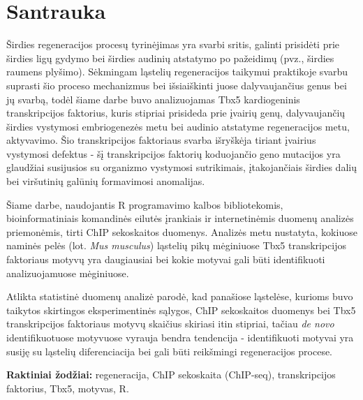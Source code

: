 \documentclass[12pt]{article}
\begin{document}

\section*{Santrauka}
Širdies regeneracijos procesų tyrinėjimas yra svarbi sritis, galinti prisidėti
prie širdies ligų gydymo bei širdies audinių atstatymo po pažeidimų (pvz.,
širdies raumens plyšimo). Sėkmingam ląstelių regeneracijos taikymui praktikoje
svarbu suprasti šio proceso mechanizmus bei išsiaiškinti juose dalyvaujančius
genus bei jų svarbą, todėl šiame darbe buvo analizuojamas Tbx5 kardiogeninis
transkripcijos faktorius, kuris stipriai prisideda prie įvairių genų,
dalyvaujančių širdies vystymosi embriogenezės metu bei audinio atstatyme
regeneracijos metu, aktyvavimo. Šio transkripcijos faktoriaus svarba išryškėja
tiriant įvairius vystymosi defektus - šį transkripcijos faktorių koduojančio
geno mutacijos yra glaudžiai susijusios su organizmo vystymosi sutrikimais,
įtakojančiais širdies dalių bei viršutinių galūnių formavimosi anomalijas.
                                                                                     
Šiame darbe, naudojantis R programavimo kalbos bibliotekomis, bioinformatiniais
komandinės eilutės įrankiais ir internetinėmis duomenų analizės priemonėmis,
tirti ChIP sekoskaitos duomenys. Analizės metu nustatyta, kokiuose naminės
pelės (lot. \emph{Mus musculus}) ląstelių pikų mėginiuose Tbx5 transkripcijos
faktoriaus motyvų yra daugiausiai bei kokie motyvai gali būti identifikuoti
analizuojamuose mėginiuose.

Atlikta statistinė duomenų analizė parodė, kad panašiose ląstelėse, kurioms
buvo taikytos skirtingos eksperimentinės sąlygos, ChIP sekoskaitos duomenys
bei Tbx5 transkripcijos faktoriaus motyvų skaičius skiriasi itin stipriai,
tačiau \emph{de novo} identifikuotuose motyvuose vyrauja bendra tendencija -
identifikuoti motyvai yra susiję su ląstelių diferenciacija bei gali būti
reikšmingi regeneracijos procese.

\hfill \break
\textbf{Raktiniai žodžiai:} regeneracija, ChIP sekoskaita (ChIP-seq),
    transkripcijos faktorius, Tbx5, motyvas, R.
\newpage

\end{document}
